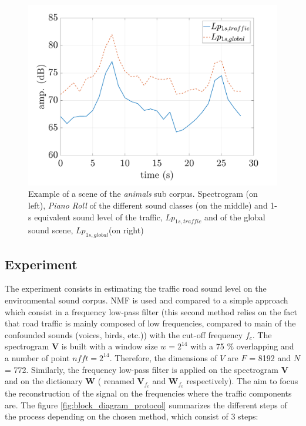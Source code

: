 \documentclass[twocolumn,a4paper,10pt]{article}
\begin{document}
\begin{figure}
\begin{minipage}[c]{.32\linewidth}
      \includegraphics[width =\linewidth]{../image/evolutionLpExample.pdf} 

   \end{minipage}
\caption{Example of a scene of the \textit{animals} sub corpus. Spectrogram (on left), \textit{Piano Roll} of the different sound classes (on the middle) and 1-s equivalent sound level of the traffic, $Lp_{1s,traffic}$ and of the global sound scene, $Lp_{1s,global}$(on right)}
\label{fig:exampleScene}
\end{figure}

\subsection{Experiment}

The experiment consists in estimating the traffic road sound level on the environmental sound corpus. NMF is used and compared to a simple approach which consist in a frequency low-pass filter (this second method relies on the fact that road traffic is mainly composed of low frequencies, compared to main of the confounded sounds (voices, birds, etc.)) with the cut-off frequency $f_c$. The spectrogram $\mathbf{V}$ is built with a window size $w = 2^{14}$ with a 75 $\%$ overlapping and a number of point $nfft = 2^{14}$. Therefore, the dimensions of $V$ are $F$ = 8192 and $N$ = 772.  Similarly, the frequency low-pass filter is applied on the spectrogram $\mathbf{V}$ and on the dictionary $\mathbf{W}$ ( renamed $\mathbf{V}_{f_c}$ and $\mathbf{W}_{f_c}$ respectively). The aim to focus the reconstruction of the signal on the frequencies where the traffic components are. The figure \ref{fig:block_diagram_protocol} summarizes the different steps of the process depending on the chosen method, which consist of 3 steps: 
\end{document}
